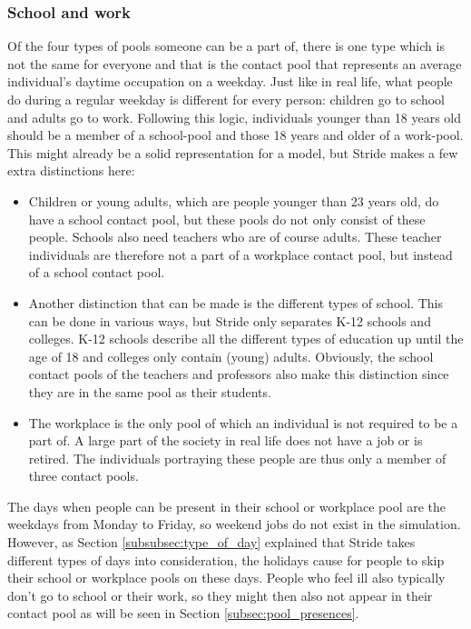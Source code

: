 \subsubsection{School and work}
Of the four types of pools someone can be a part of, there is one type which is not the same for everyone and that is the contact pool that represents an average individual's daytime occupation on a weekday. Just like in real life, what people do during a regular weekday is different for every person: children go to school and adults go to work. Following this logic, individuals younger than 18 years old should be a member of a school-pool and those 18 years and older of a work-pool. This might already be a solid representation for a model, but Stride makes a few extra distinctions here:
\begin{itemize}
    \item Children or young adults, which are people younger than 23 years old, do have a school contact pool, but these pools do not only consist of these people. Schools also need teachers who are of course adults. These teacher individuals are therefore not a part of a workplace contact pool, but instead of a school contact pool.
    \item Another distinction that can be made is the different types of school. This can be done in various ways, but Stride only separates K-12 schools and colleges. K-12 schools describe all the different types of education up until the age of 18 and colleges only contain (young) adults. Obviously, the school contact pools of the teachers and professors also make this distinction since they are in the same pool as their students.
    \item The workplace is the only pool of which an individual is not required to be a part of. A large part of the society in real life does not have a job or is retired. The individuals portraying these people are thus only a member of three contact pools.
\end{itemize}
The days when people can be present in their school or workplace pool are the weekdays from Monday to Friday, so weekend jobs do not exist in the simulation. However, as Section \ref{subsubsec:type_of_day} explained that Stride takes different types of days into consideration, the holidays cause for people to skip their school or workplace pools on these days. People who feel ill also typically don't go to school or their work, so they might then also not appear in their contact pool as will be seen in Section \ref{subsec:pool_presences}.

